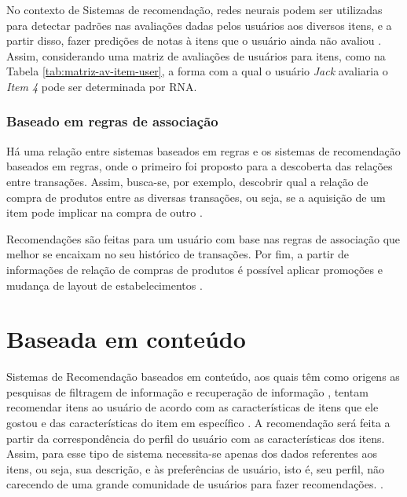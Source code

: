         No contexto de Sistemas de recomendação, redes neurais podem ser utilizadas para detectar padrões nas avaliações dadas pelos usuários aos diversos itens, e a partir disso, fazer predições de notas à itens que o usuário ainda não avaliou \cite{Ricci2010}. Assim, considerando uma matriz de avaliações de usuários para itens, como na Tabela \ref{tab:matriz-av-item-user}, a forma com a qual o usuário \textit{Jack} avaliaria o \textit{Item 4} pode ser determinada por RNA.
                  
        \subsubsection{Baseado em regras de associação}
        
        Há uma relação entre sistemas baseados em regras e os sistemas de recomendação baseados em regras, onde o primeiro foi proposto para a descoberta das relações entre transações. Assim, busca-se, por exemplo, descobrir qual a relação de compra de produtos entre as diversas transações, ou seja, se a aquisição de um item pode implicar na compra de outro \cite{Aggarwal2016}.  
        
        Recomendações são feitas para um usuário com base nas regras de associação que melhor se encaixam no seu histórico de transações.
        Por fim, a partir de informações de relação de compras de produtos é possível aplicar promoções e mudança de layout de estabelecimentos \cite{Jannach2010}.
            
\section{Baseada em conteúdo}

    Sistemas de Recomendação baseados em conteúdo, aos quais têm como origens as pesquisas de filtragem de informação e recuperação de informação \cite{Cazella2010}, tentam recomendar itens ao usuário de acordo com as características de itens que ele gostou e das características do item em específico \cite{Ricci2010}. A recomendação será feita a partir da correspondência do perfil do usuário com as características dos itens. Assim, para esse tipo de sistema necessita-se apenas dos dados referentes aos itens, ou seja, sua descrição, e às preferências de usuário, isto é, seu perfil, não carecendo de uma grande comunidade de usuários para fazer recomendações. \cite{Jannach2010}. 

